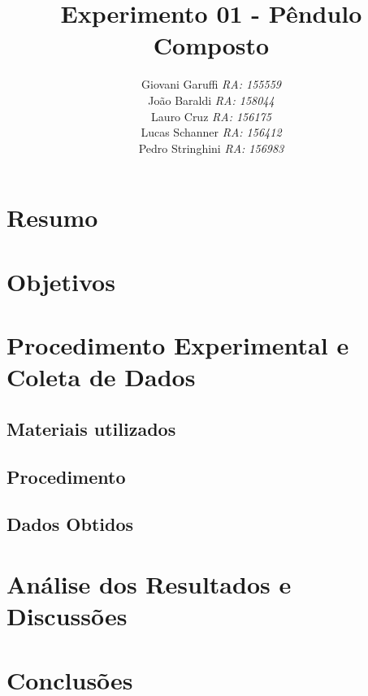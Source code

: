 \documentclass[12pt,a4paper]{article}
\begin{document}
\title{\vspace{70mm}\Huge Experimento 01 - Pêndulo Composto}
\author{ Giovani Garuffi\qquad\hfill
		\textit {RA: 155559}\protect\\
		João Baraldi\hfill
		\textit{RA: 158044}\protect\\
		Lauro Cruz\hfill
		\textit{RA: 156175}\protect\\
		Lucas Schanner\hfill
		\textit{RA: 156412}\protect\\
		Pedro Stringhini\hfill
		\textit {RA: 156983}								
		}
\maketitle
\newpage
\section{Resumo}


\section{Objetivos}


\section{Procedimento Experimental e Coleta de Dados}
\subsection{Materiais utilizados}
\subsection{Procedimento}



\subsection{Dados Obtidos}




\section{Análise dos Resultados e Discussões}


\section{Conclusões}
\end{document}
